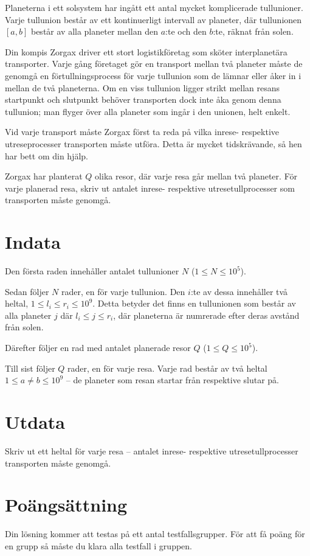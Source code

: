 Planeterna i ett solsystem har ingått ett antal mycket komplicerade tullunioner.
Varje tullunion består av ett kontinuerligt intervall av planeter, där tullunionen $[a, b]$ består av alla planeter mellan den $a$:te och den $b$:te, räknat från solen.

Din kompis Zorgax driver ett stort logistikföretag som sköter interplanetära transporter.
Varje gång företaget gör en transport mellan två planeter måste de genomgå en förtullningsprocess för varje tullunion som de lämnar eller åker in i mellan de två planeterna.
Om en viss tullunion ligger strikt mellan resans startpunkt och slutpunkt behöver transporten dock inte åka genom denna tullunion; man flyger över alla planeter som ingår i den unionen, helt enkelt.

Vid varje transport måste Zorgax först ta reda på vilka inrese- respektive utreseprocesser transporten måste utföra.
Detta är mycket tidskrävande, så hen har bett om din hjälp.

Zorgax har planterat $Q$ olika resor, där varje resa går mellan två planeter.
För varje planerad resa, skriv ut antalet inrese- respektive utresetullprocesser som transporten måste genomgå. 


\section*{Indata}
Den första raden innehåller antalet tullunioner $N$ ($1 \le N \le 10^5$).

Sedan följer $N$ rader, en för varje tullunion.
Den $i$:te av dessa innehåller två heltal, $1 \le l_i \leq r_i \le 10^9$.
Detta betyder det finns en tullunionen som består av alla planeter $j$ där $l_i \leq j \leq r_i$, där planeterna är numrerade efter deras avstånd från solen.

Därefter följer en rad med antalet planerade resor $Q$ ($1 \le Q \le 10^5$).

Till sist följer $Q$ rader, en för varje resa.
Varje rad består av två heltal $1 \le a \neq b \le 10^9$ -- de planeter som resan startar från respektive slutar på.

\section*{Utdata}
Skriv ut ett heltal för varje resa -- antalet inrese- respektive utresetullprocesser transporten måste genomgå.

\section*{Poängsättning}
Din lösning kommer att testas på ett antal testfallsgrupper.
För att få poäng för en grupp så måste du klara alla testfall i gruppen.

